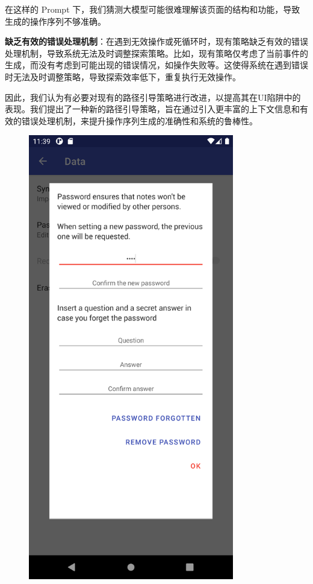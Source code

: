 \documentclass[UTF8, fontset=windows]{article}
\begin{document}
在这样的 Prompt 下，我们猜测大模型可能很难理解该页面的结构和功能，导致生成的操作序列不够准确。

\textbf{缺乏有效的错误处理机制}：在遇到无效操作或死循环时，现有策略缺乏有效的错误处理机制，导致系统无法及时调整探索策略。比如，现有策略仅考虑了当前事件的生成，而没有考虑到可能出现的错误情况，如操作失败等。这使得系统在遇到错误时无法及时调整策略，导致探索效率低下，重复执行无效操作。

因此，我们认为有必要对现有的路径引导策略进行改进，以提高其在UI陷阱中的表现。我们提出了一种新的路径引导策略，旨在通过引入更丰富的上下文信息和有效的错误处理机制，来提升操作序列生成的准确性和系统的鲁棒性。

\begin{figure}[ht!]
    \begin{minipage}
        [t]{0.4\textwidth}
            \centering
            \includegraphics[width=0.8\textwidth]{2.png}

\end{minipage}
\end{figure}
\end{document}
